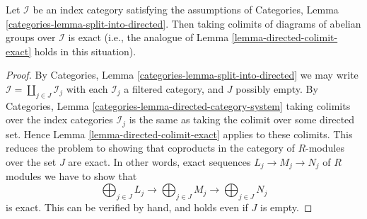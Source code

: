 \begin{lemma}
\label{lemma-almost-directed-colimit-exact}
Let $\mathcal{I}$ be an index category satisfying the assumptions of
Categories, Lemma \ref{categories-lemma-split-into-directed}.
Then taking colimits of diagrams of abelian groups over $\mathcal{I}$
is exact (i.e., the analogue of
Lemma \ref{lemma-directed-colimit-exact}
holds in this situation).
\end{lemma}

\begin{proof}
By
Categories, Lemma \ref{categories-lemma-split-into-directed}
we may write $\mathcal{I} = \coprod_{j \in J} \mathcal{I}_j$ with each
$\mathcal{I}_j$ a filtered category, and $J$ possibly empty. By
Categories, Lemma \ref{categories-lemma-directed-category-system}
taking colimits over the index categories $\mathcal{I}_j$ is
the same as taking the colimit over some directed set. Hence
Lemma \ref{lemma-directed-colimit-exact}
applies to these colimits. This reduces the problem to showing that
coproducts in the category of $R$-modules over the set $J$ are exact.
In other words, exact sequences
$L_j \to M_j \to N_j$ of $R$ modules we have to show that
$$
\bigoplus\nolimits_{j \in J} L_j
\longrightarrow
\bigoplus\nolimits_{j \in J} M_j
\longrightarrow
\bigoplus\nolimits_{j \in J} N_j
$$
is exact. This can be verified by hand, and holds even if $J$ is empty.
\end{proof}